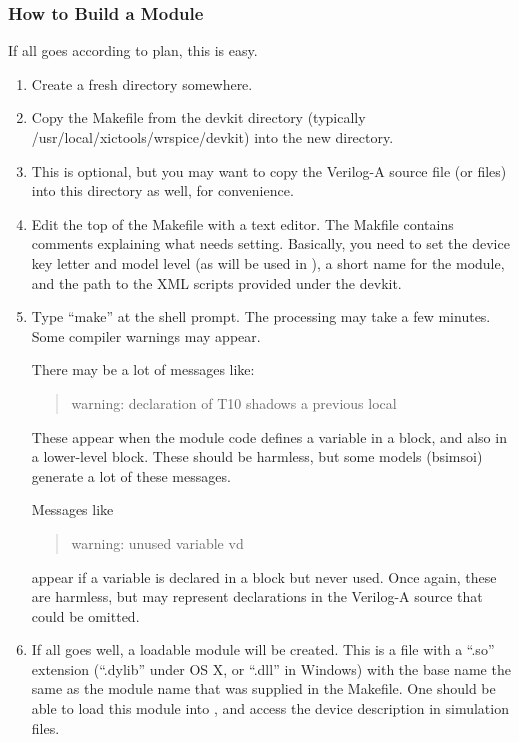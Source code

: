 \subsubsection{How to Build a Module}

If all goes according to plan, this is easy.

\begin{enumerate}
\item {Create a fresh directory somewhere.}

\item {Copy the {\vt Makefile} from the {\vt devkit} directory
(typically {\vt /usr/local/xictools/wrspice/devkit}) into the
new directory.}

\item {This is optional, but you may want to copy the Verilog-A
source file (or files) into this directory as well, for
convenience.}

\item {Edit the top of the {\vt Makefile} with a text editor.  The
{\vt Makfile} contains comments explaining what needs setting. 
Basically, you need to set the device key letter and model level (as
will be used in {\WRspice}), a short name for the module, and the path
to the XML scripts provided under the {\vt devkit}.}

\item {Type ``{\vt make}'' at the shell prompt.  The processing may
take a few minutes.  Some compiler warnings may appear.

There may be a lot of messages like:
\begin{quote}
  {\vt warning: declaration of T10 shadows a previous local}
\end{quote}
These appear when the module code defines a variable in a block, and
also in a lower-level block.  These should be harmless, but some
models ({\vt bsimsoi}) generate a lot of these messages.

Messages like
\begin{quote}
  {\vt warning: unused variable vd}
\end{quote}
appear if a variable is declared in a block but never used.  Once
again, these are harmless, but may represent declarations in the
Verilog-A source that could be omitted.}

\item {If all goes well, a loadable module will be created.  This is a
file with a ``{\vt .so}'' extension (``{\vt .dylib}'' under OS X, or
``{\vt .dll}'' in Windows) with the base name the same as the module
name that was supplied in the {\vt Makefile}.  One should be able to
load this module into {\WRspice}, and access the device description in
simulation files.}
\end{enumerate}

